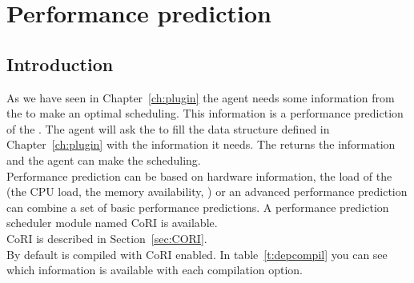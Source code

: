 
\chapter{Performance prediction}
\label{chapter:performance}
\section{Introduction}

As we have seen in Chapter~\ref{ch:plugin} the agent needs some information
from the \sed to make an optimal scheduling. This information is a performance
prediction of the \sed. The agent will ask the \sed to fill the data structure
defined in Chapter~\ref{ch:plugin} with the information it needs. The \sed
returns the information and the agent can make the scheduling.\\ Performance
prediction can be based on hardware information, the load of the \sed (the CPU
load, the memory availability, \etc) or an advanced performance prediction can
combine a set of basic performance predictions. A performance prediction 
scheduler module named CoRI  is available.
\\CoRI is described in Section~\ref{sec:CORI}.\\
By default \diet is compiled with CoRI enabled.
In table~\ref{t:depcompil} you can see which
information is available with each compilation option.

